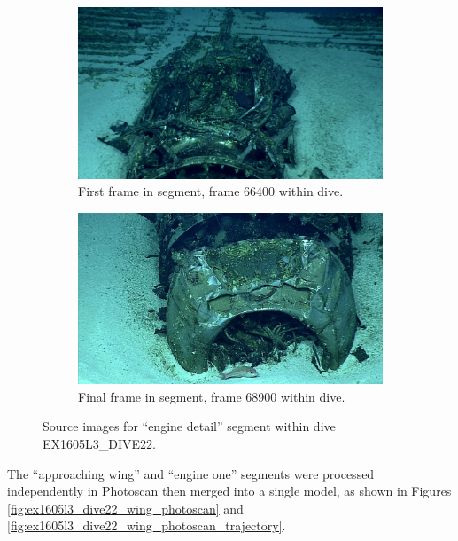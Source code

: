 \documentclass[letterpaper,12pt]{article}
\begin{document}
\begin{figure}
    \centering
    \begin{subfigure}[b]{0.48\textwidth}
        \includegraphics[width=\textwidth]{images/image_066400.png}
        \caption{First frame in segment, frame 66400 within dive.}
        \label{fig:ex1605l3_dive22_engine_detail_begin}
    \end{subfigure}
    \begin{subfigure}[b]{0.48\textwidth}
        \includegraphics[width=\textwidth]{images/image_068900.png}
        \caption{Final frame in segment, frame 68900 within dive.}
        \label{fig:ex1605l3_dive22_engine_detail_end}
    \end{subfigure}
    \caption{Source images for ``engine detail'' segment within dive EX1605L3\_DIVE22.}
\end{figure}

The ``approaching wing'' and ``engine one'' segments were processed independently in Photoscan then merged into a single model, as shown in Figures \ref{fig:ex1605l3_dive22_wing_photoscan} and \ref{fig:ex1605l3_dive22_wing_photoscan_trajectory}. 
\end{document}
